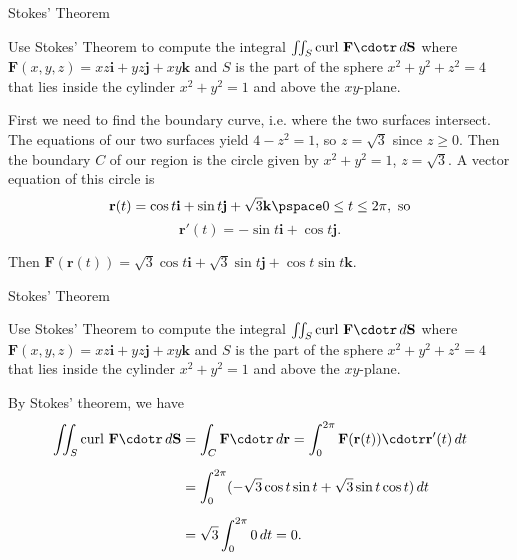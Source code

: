 \documentclass[11pt,english,
handout
]{beamer}
\begin{document}
\begin{frame}[t]{Stokes' Theorem}
\small
\begin{example}
Use Stokes' Theorem to compute the integral $\iint_S\text{curl }\mathbf{F}\cdotr\,d\mathbf{S}$ where $\mathbf{F}(x,y,z)=xz\mathbf{i}+yz\mathbf{j}+xy\mathbf{k}$ and $S$ is the part of the sphere $x^2+y^2+z^2=4$ that lies inside the cylinder $x^2+y^2=1$ and above the $xy$-plane.

\lspace
First we need to find the boundary curve, i.e. where the two surfaces intersect. \pause The equations of our two surfaces yield $4-z^2=1$, so $z=\sqrt{3}$ since $z\geq 0$. Then the boundary $C$ of our region is the circle given by $x^2+y^2=1$, $z=\sqrt{3}$. \pause A vector equation of this circle is
\[
\mathbf{r}(t)=\cos t\mathbf{i}+\sin t\mathbf{j}+\sqrt{3}\mathbf{k}\pspace 0\leq t\leq 2\pi,\text{ so}
\]
\[
\mathbf{r}'(t)=-\sin t\mathbf{i}+\cos t\mathbf{j}.
\]

\vspace{3mm}
Then $\mathbf{F}(\mathbf{r}(t))=\sqrt{3}\cos t\mathbf{i}+\sqrt{3}\sin t\mathbf{j}+\cos t\sin t\mathbf{k}$. 
\end{example}
\end{frame}









\begin{frame}[t]{Stokes' Theorem}
\small
\begin{example}
Use Stokes' Theorem to compute the integral $\iint_S\text{curl }\mathbf{F}\cdotr\,d\mathbf{S}$ where $\mathbf{F}(x,y,z)=xz\mathbf{i}+yz\mathbf{j}+xy\mathbf{k}$ and $S$ is the part of the sphere $x^2+y^2+z^2=4$ that lies inside the cylinder $x^2+y^2=1$ and above the $xy$-plane.

\lspace
By Stokes' theorem, we have
\begin{align*}
\iint_S\text{curl }\mathbf{F}\cdotr\,d\mathbf{S}&=\int_C\mathbf{F}\cdotr\,d\mathbf{r}=\int_0^{2\pi}\mathbf{F}(\mathbf{r}(t))\cdotr\mathbf{r}'(t)\,dt\\[2mm]
&=\int_0^{2\pi}(-\sqrt{3}\cos t\sin t+\sqrt{3}\sin t\cos t)\,dt\\[2mm]
&=\sqrt{3}\int_0^{2\pi}0\,dt=0.
\end{align*}
\end{example}
\end{frame}
\end{document}
